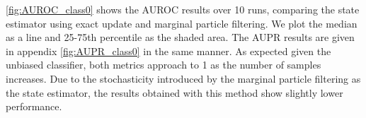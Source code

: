 \autoref{fig:AUROC_class0} shows the AUROC results over 10 runs, comparing the state estimator using exact update and marginal particle filtering. We plot the median as a line and 25-75th percentile as the shaded area. The AUPR results are given in appendix \autoref{fig:AUPR_class0} in the same manner. As expected given the unbiased classifier, both metrics approach to 1 as the number of samples increases. Due to the stochasticity introduced by the marginal particle filtering as the state estimator, the results obtained with this method show slightly lower performance. 

